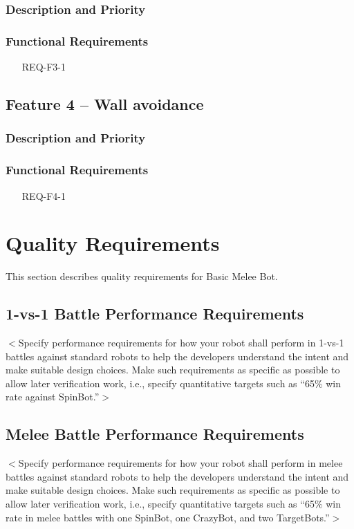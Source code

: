 \documentclass{scrreprt}
\begin{document}
\subsection{Description and Priority}

\subsection{Functional Requirements}
\begin{itemize}
\item[REQ-F3-1]
\end{itemize}

\section{Feature 4 -- Wall avoidance}

\subsection{Description and Priority}

\subsection{Functional Requirements}
\begin{itemize}
\item[REQ-F4-1]
\end{itemize}

\chapter{Quality Requirements}
This section describes quality requirements for Basic Melee Bot.

\section{1-vs-1 Battle Performance Requirements}
$<$Specify performance requirements for how your robot shall perform in 1-vs-1 battles against standard robots to help the developers understand the intent and make suitable design choices. Make such requirements as specific as possible to allow later verification work, i.e., specify quantitative targets such as ``65\% win rate against SpinBot.''$>$

\section{Melee Battle Performance Requirements}
$<$Specify performance requirements for how your robot shall perform in melee battles against standard robots to help the developers understand the intent and make suitable design choices. Make such requirements as specific as possible to allow later verification work, i.e., specify quantitative targets such as ``65\% win rate in melee battles with one SpinBot, one CrazyBot, and two TargetBots.''$>$
\end{document}
